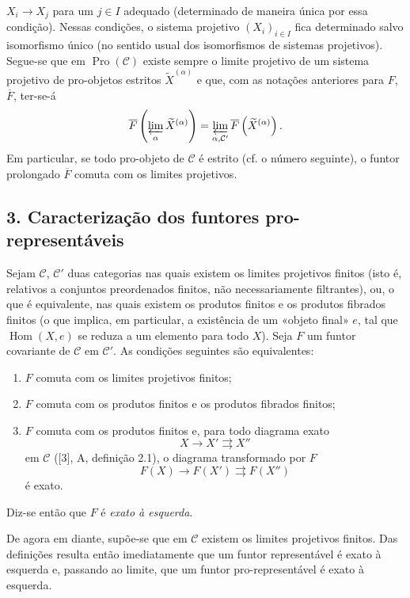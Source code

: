 \documentclass[11pt,twoside,openany]{book}
\numberwithin{equation}{section}
\newcommand{\src}[1]{%
  \phantomsection\hypertarget{src:#1}{}%
  \marginpar{\raggedleft\footnotesize\sffamily #1}%
}
\theoremstyle{plain}
\theoremstyle{definition}
\theoremstyle{remark}
\newcommand{\FgaUnitKey}{frontmatter}
\renewcommand{\src}[1]{%
  \phantomsection\hypertarget{src:\FgaUnitKey:#1}{}%
  \marginpar{\raggedleft\footnotesize\sffamily #1}%
}
\begin{document}
\src{373}
$X_i\longrightarrow X_j$ para um $j\in I$ adequado (determinado de maneira
única por essa condição). Nessas condições, o sistema projetivo
$(X_i)_{i\in I}$ fica determinado salvo isomorfismo único (no sentido usual
dos isomorfismos de sistemas projetivos). Segue-se que em
$\operatorname{Pro}(\mathcal C)$ existe sempre o limite projetivo de um
sistema projetivo de pro-objetos estritos $\widetilde X^{(\alpha)}$ e que, com
as notações anteriores para $F$, $\overline F$, ter-se-á
\[
  \overline F\left(\varprojlim_\alpha\widetilde X^{(\alpha)}\right)
  =\varprojlim_{\alpha,\mathcal C'}
  \overline F\left(\widetilde X^{(\alpha)}\right).
\]
Em particular, se todo pro-objeto de $\mathcal C$ é estrito (cf. o número
seguinte), o funtor prolongado $\overline F$ comuta com os limites
projetivos.

\subsection*{3. Caracterização dos funtores pro-representáveis}

Sejam $\mathcal C$, $\mathcal C'$ duas categorias nas quais existem os limites
projetivos finitos (isto é, relativos a conjuntos preordenados finitos, não
necessariamente filtrantes), ou, o que é equivalente, nas quais existem os
produtos finitos e os produtos fibrados finitos (o que implica, em
particular, a existência de um «objeto final» $e$, tal que
$\operatorname{Hom}(X,e)$ se reduza a um elemento para todo $X$). Seja $F$ um
funtor covariante de $\mathcal C$ em $\mathcal C'$. As condições seguintes
são equivalentes:

\begin{enumerate}
\item[(i)] $F$ comuta com os limites projetivos finitos;
\item[(ii)] $F$ comuta com os produtos finitos e os produtos fibrados finitos;
\item[(iii)] $F$ comuta com os produtos finitos e, para todo diagrama exato
\[
  X\longrightarrow X'\rightrightarrows X''
\]
em $\mathcal C$ ([3], A, definição 2.1), o diagrama transformado por $F$
\[
  F(X)\longrightarrow F(X')\rightrightarrows F(X'')
\]
é exato.
\end{enumerate}

Diz-se então que $F$ é \emph{exato à esquerda}.

De agora em diante, supõe-se que em $\mathcal C$ existem os limites projetivos
finitos. Das definições resulta então imediatamente que um funtor
representável é exato à esquerda e, passando ao limite, que um funtor
pro-representável é exato à esquerda.
\end{document}
